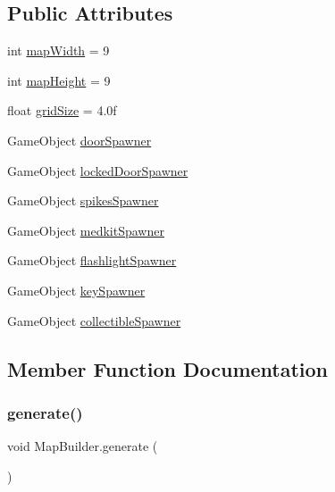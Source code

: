 \subsection*{Public Attributes}
\begin{DoxyCompactItemize}
\item 
int \mbox{\hyperlink{class_map_builder_a00a96026df849c4657812f208d202e65}{map\+Width}} = 9
\item 
int \mbox{\hyperlink{class_map_builder_a3e935492014232556adff51bf610ae3a}{map\+Height}} = 9
\item 
float \mbox{\hyperlink{class_map_builder_a29530adbb5804e1fff23979145f02548}{grid\+Size}} = 4.\+0f
\item 
Game\+Object \mbox{\hyperlink{class_map_builder_ad734824eb6a941fca8b687306a8ebd55}{door\+Spawner}}
\item 
Game\+Object \mbox{\hyperlink{class_map_builder_afd64d7925ca8edebc31d2c1f4cee6a07}{locked\+Door\+Spawner}}
\item 
Game\+Object \mbox{\hyperlink{class_map_builder_a9bdd358b678d7642883bee3efe84af76}{spikes\+Spawner}}
\item 
Game\+Object \mbox{\hyperlink{class_map_builder_a1fa1d133a609bdd4000f96521f4a216d}{medkit\+Spawner}}
\item 
Game\+Object \mbox{\hyperlink{class_map_builder_a0320f9227b9044770359d0c40c0f7256}{flashlight\+Spawner}}
\item 
Game\+Object \mbox{\hyperlink{class_map_builder_a260ce7d42b56afbcd9fc32684206b907}{key\+Spawner}}
\item 
Game\+Object \mbox{\hyperlink{class_map_builder_a15863585774e7c204317af731ee689fc}{collectible\+Spawner}}
\end{DoxyCompactItemize}


\subsection{Member Function Documentation}
\mbox{\label{class_map_builder_aa28ecb78f0823dc8ddd3f8971910dda1}} 
\subsubsection{\texorpdfstring{generate()}{generate()}}
{\footnotesize\ttfamily void Map\+Builder.\+generate (\begin{DoxyParamCaption}{ }\end{DoxyParamCaption})}

